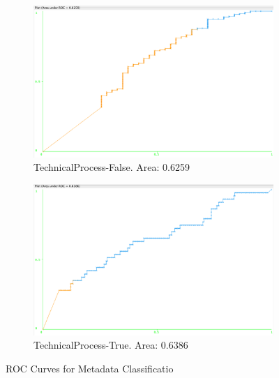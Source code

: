 \documentclass[11pt, notitlepage,abstracton,oneside]{article}   	%
\begin{document}
\begin{figure}[H]
    \ContinuedFloat

    \begin{subfigure}[b]{0.45\textwidth}
        \centering
        \includegraphics[width=\textwidth]{figures/approach2/TechnicalProcess-False(0)}
        \caption{TechnicalProcess-False. Area: 0.6259}
        \label{fig:TechnicalProcess-False(0)}
    \end{subfigure}
    \hfill
    \begin{subfigure}[b]{0.45\textwidth}
        \centering
        \includegraphics[width=\textwidth]{figures/approach2/TechnicalProcess-True(1)}
        \caption{TechnicalProcess-True. Area: 0.6386}
        \label{fig:TechnicalProcess-True(1)}
    \end{subfigure}
    \hfill

    \caption{ROC Curves for Metadata Classificatio}
    \label{fig:Approach 2 ROC Curves}
\end{figure}
\end{document}
